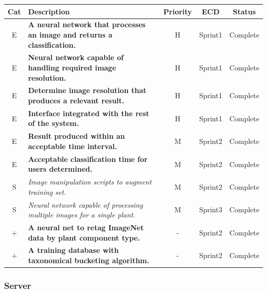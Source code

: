 \documentclass[a4paper,11pt]{article}
\begin{document}
\begin{table}[H]
\small
\centering
\begin{tabular}{ c p{11cm} c c c}
  Cat & Description & Priority & ECD & Status \\
  \hline
  E & \textbf{A neural network that processes an image and returns a classification.} & H & Sprint1 & Complete \\
  E & \textbf{Neural network capable of handling required image resolution.} & H & Sprint1 & Complete \\
  E & \textbf{Determine image resolution that produces a relevant result.} & H & Sprint1 & Complete \\
  E & \textbf{Interface integrated with the rest of the system.} & H & Sprint1 & Complete \\
  E & \textbf{Result produced within an acceptable time interval.} & M & Sprint2 & Complete \\
  E & \textbf{Acceptable classification time for users determined.} & M & Sprint2 & Complete \\
    S & \textit{Image manipulation scripts to augment training set.} & M & Sprint2 & Complete \\
  S & \textit{Neural network capable of processing multiple images for a single plant.} & M & Sprint3 & Complete \\
  \hdashline
  $+$ & \textbf{A neural net to retag ImageNet data by plant component type.} & - & Sprint2 & Complete\\
  $+$ & \textbf{A training database with taxonomical bucketing algorithm.} & - & Sprint2 & Complete \\
\end{tabular}
\end{table}

\subsubsection{Server}
\end{document}
